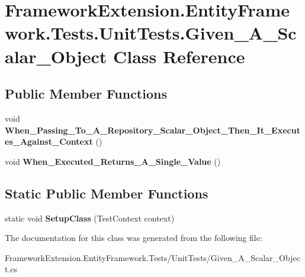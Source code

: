 \hypertarget{class_framework_extension_1_1_entity_framework_1_1_tests_1_1_unit_tests_1_1_given___a___scalar___object}{\section{Framework\-Extension.\-Entity\-Framework.\-Tests.\-Unit\-Tests.\-Given\-\_\-\-A\-\_\-\-Scalar\-\_\-\-Object Class Reference}
\label{class_framework_extension_1_1_entity_framework_1_1_tests_1_1_unit_tests_1_1_given___a___scalar___object}
}
\subsection*{Public Member Functions}
\begin{DoxyCompactItemize}
\item 
\hypertarget{class_framework_extension_1_1_entity_framework_1_1_tests_1_1_unit_tests_1_1_given___a___scalar___object_a863da0b1f8d23ac9d88f98a005bb0665}{void {\bfseries When\-\_\-\-Passing\-\_\-\-To\-\_\-\-A\-\_\-\-Repository\-\_\-\-Scalar\-\_\-\-Object\-\_\-\-Then\-\_\-\-It\-\_\-\-Executes\-\_\-\-Against\-\_\-\-Context} ()}\label{class_framework_extension_1_1_entity_framework_1_1_tests_1_1_unit_tests_1_1_given___a___scalar___object_a863da0b1f8d23ac9d88f98a005bb0665}

\item 
\hypertarget{class_framework_extension_1_1_entity_framework_1_1_tests_1_1_unit_tests_1_1_given___a___scalar___object_a4e561f4e4ea40f556495bd8773e979fb}{void {\bfseries When\-\_\-\-Executed\-\_\-\-Returns\-\_\-\-A\-\_\-\-Single\-\_\-\-Value} ()}\label{class_framework_extension_1_1_entity_framework_1_1_tests_1_1_unit_tests_1_1_given___a___scalar___object_a4e561f4e4ea40f556495bd8773e979fb}

\end{DoxyCompactItemize}
\subsection*{Static Public Member Functions}
\begin{DoxyCompactItemize}
\item 
\hypertarget{class_framework_extension_1_1_entity_framework_1_1_tests_1_1_unit_tests_1_1_given___a___scalar___object_ab3aeaff417f2f8e98b74754fc7c2ec3b}{static void {\bfseries Setup\-Class} (Test\-Context context)}\label{class_framework_extension_1_1_entity_framework_1_1_tests_1_1_unit_tests_1_1_given___a___scalar___object_ab3aeaff417f2f8e98b74754fc7c2ec3b}

\end{DoxyCompactItemize}


The documentation for this class was generated from the following file\-:\begin{DoxyCompactItemize}
\item 
Framework\-Extension.\-Entity\-Framework.\-Tests/\-Unit\-Tests/Given\-\_\-\-A\-\_\-\-Scalar\-\_\-\-Object.\-cs\end{DoxyCompactItemize}
